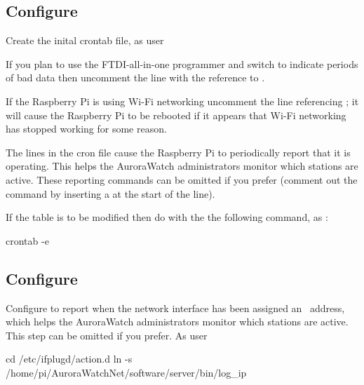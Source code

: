 \subsection{Configure \protect{}}
\label{sec:cron-configuration}

Create the inital crontab file, as user \piUser
%
%

If you plan to use the FTDI-all-in-one programmer and switch to
indicate periods of bad data then uncomment the line with the
reference to .

If the Raspberry Pi is using Wi-Fi networking uncomment the line
referencing ; it will cause the Raspberry
Pi to be rebooted if it appears that Wi-Fi networking has stopped
working for some reason.

The  lines in the cron file cause the Raspberry Pi to
periodically report that it is operating. This helps the AuroraWatch
administrators monitor which stations are active. These reporting
commands can be omitted if you prefer (comment out the command by
inserting a \code{\#} at the start of the line).

If the  table is to be modified then do with the the
following command, as \piUser:

\begin{Cmd}
crontab -e  
\end{Cmd}


\subsection{Configure \protect{}}

Configure  to report when the network interface has
been assigned an \ip\ address, which helps the AuroraWatch
administrators monitor which stations are active. This step can be
omitted if you prefer. As user \rootUser
\begin{Cmd}
cd /etc/ifplugd/action.d
ln -s /home/pi/AuroraWatchNet/software/server/bin/log_ip
\end{Cmd}

